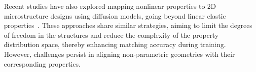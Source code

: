 Recent studies have also explored mapping nonlinear properties to 2D microstructure designs using diffusion models, going beyond linear elastic properties~\cite{Bastek2023, Vlassis2023, Li2023, Park2024}.
These approaches share similar strategies, aiming to limit the degrees of freedom in the structures and reduce the complexity of the property distribution space, thereby enhancing matching accuracy during training. However, challenges persist in aligning non-parametric geometries with their corresponding properties.

